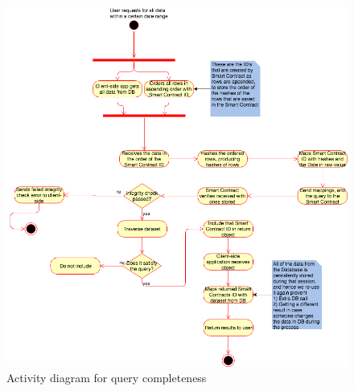 \begin{figure}[h]%
\centering
\includegraphics[width=1.0\textwidth]{images/queryCompleteness.png}
\caption{\label{fig:queryCompleteness}Activity diagram for query completeness}
\end{figure}


